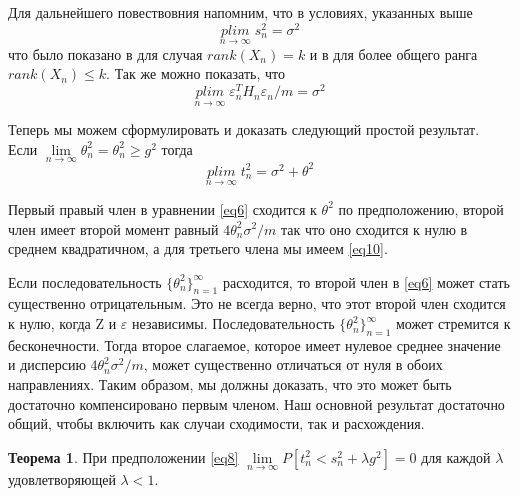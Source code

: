 \documentclass[12pt, twoside]{article}
\theoremstyle{definition}
\newtheorem*{theorem*}{Теорема}
\begin{document}
Для дальнейшего повествовния напомним, что в условиях, указанных выше
\begin{equation}\label{eq9}
\underset{n \to \infty}{plim}\;s_n^2 = \sigma^2
\end{equation}
что было показано в \cite{bib_1} для случая $\textit{rank}(X_n) = k$ и в \cite{bib_2} для более общего ранга $\textit{rank}(X_n) \leq k$. Так же можно показать, что
\begin{equation}\label{eq10}
\underset{n \to \infty}{plim}\;\varepsilon_n^{T} H_n \varepsilon_n/m = \sigma^2
\end{equation}

Теперь мы можем сформулировать и доказать следующий простой результат. 
Если $\lim\limits_{n \to \infty} \theta_n^2 = \theta_n^2 \geq g^2 $ тогда 
\begin{equation}\label{eq11}
\underset{n \to \infty}{plim}\;t_n^2 = \sigma^2+\theta^2
\end{equation}

Первый правый член в уравнении \eqref{eq6} сходится к $\theta^2$ по предположению, второй член имеет второй момент равный $4\theta_n^{2}\sigma^2/m$ так что оно сходится к нулю в среднем квадратичном, а для третьего члена мы имеем \eqref{eq10}.

Если последовательность $\{\theta_n^2\}_{n=1}^{\infty}$ расходится, то второй член в \eqref{eq6} может стать существенно отрицательным. Это не всегда верно, что этот второй член сходится к нулю,
когда Z и $\varepsilon$ независимы. Последовательность $\{\theta_n^2\}_{n=1}^{\infty}$ может стремится к бесконечности. Тогда второе слагаемое, которое имеет нулевое среднее значение и дисперсию $4\theta_n^{2}\sigma^2/m$, может существенно отличаться от нуля в обоих направлениях. Таким образом, мы должны доказать, что это может быть достаточно компенсировано первым членом. Наш основной результат достаточно общий, чтобы включить как случаи сходимости, так и расхождения. 

\begin{theorem*}
При предположении \eqref{eq8} $\lim\limits_{n \to \infty} P[t_n^2< s_n^2 + \lambda g^2] =0 $ для каждой $\lambda$ удовлетворяющей $\lambda < 1$.
\end{theorem*}
\end{document}
